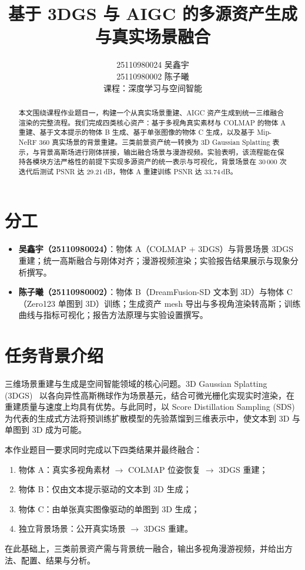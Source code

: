 \documentclass{article}
\title{基于 3DGS 与 AIGC 的多源资产生成与真实场景融合}
\author{%
  25110980024 吴鑫宇 \\
  25110980002 陈子曦 \\
  课程：深度学习与空间智能 \\
}
\begin{document}
\maketitle

\section*{分工}
\begin{itemize}
  \item \textbf{吴鑫宇（25110980024）}：物体 A（COLMAP + 3DGS）与背景场景 3DGS 重建；统一高斯融合与刚体对齐；漫游视频渲染；实验报告结果展示与现象分析撰写。
  \item \textbf{陈子曦（25110980002）}：物体 B（DreamFusion-SD 文本到 3D）与物体 C（Zero123 单图到 3D）训练；生成资产 mesh 导出与多视角渲染转高斯；训练曲线与指标可视化；报告方法原理与实验设置撰写。
\end{itemize}

\begin{abstract}
本文围绕课程作业题目一，构建一个从真实场景重建、AIGC 资产生成到统一三维融合渲染的完整流程。我们完成四类核心资产：基于多视角真实素材与 COLMAP 的物体 A 重建、基于文本提示的物体 B 生成、基于单张图像的物体 C 生成，以及基于 Mip-NeRF 360 真实场景的背景重建。三类前景资产统一转换为 3D Gaussian Splatting 表示，与背景高斯场进行刚体拼接，输出融合场景与漫游视频。实验表明，该流程能在保持各模块方法严格性的前提下实现多源资产的统一表示与可视化，背景场景在 30\,000 次迭代后测试 PSNR 达 29.21\,dB，物体 A 重建训练 PSNR 达 33.74\,dB。
\end{abstract}

\section{任务背景介绍}

三维场景重建与生成是空间智能领域的核心问题。3D Gaussian Splatting (3DGS)~\cite{kerbl20233dgs} 以各向异性高斯椭球作为场景基元，结合可微光栅化实现实时渲染，在重建质量与速度上均具有优势。与此同时，以 Score Distillation Sampling (SDS)~\cite{poole2022dreamfusion} 为代表的生成式方法将预训练扩散模型的先验蒸馏到三维表示中，使文本到 3D 与单图到 3D 成为可能。

本作业题目一要求同时完成以下四类结果并最终融合：
\begin{enumerate}
  \item 物体 A：真实多视角素材 $\rightarrow$ COLMAP 位姿恢复 $\rightarrow$ 3DGS 重建；
  \item 物体 B：仅由文本提示驱动的文本到 3D 生成；
  \item 物体 C：由单张真实图像驱动的单图到 3D 生成；
  \item 独立背景场景：公开真实场景 $\rightarrow$ 3DGS 重建。
\end{enumerate}
在此基础上，三类前景资产需与背景统一融合，输出多视角漫游视频，并给出方法、配置、结果与分析。
\end{document}
